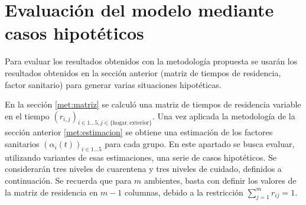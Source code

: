 \section{Evaluación del modelo mediante casos hipotéticos} \label{met:evaluacion}

Para evaluar los resultados obtenidos con la metodología propuesta se usarán los resultados obtenidos en la sección anterior (matriz de tiempos de residencia, factor sanitario) para generar varias situaciones hipotéticas.






En la sección \ref{met:matriz} se calculó una matriz de tiempos de residencia variable en el tiempo \((r_{i,j})_{i \in 1\dots 5, j \in \{ \text{hogar}, \text{exterior}\}}\).  Una vez aplicada la metodología de la sección anterior \ref{met:estimacion} se obtiene una estimación de los factores sanitarios \((\alpha_i(t))_{i \in 1 \dots 5}\) para cada grupo. En este apartado se busca evaluar, utilizando variantes de esas estimaciones, una serie de casos hipotéticos. Se considerarán tres niveles de cuarentena y tres niveles de cuidado, definidos a continuación. Se recuerda que para \(m\) ambientes, basta con definir los valores de la matriz de residencia en \(m-1\) columnas, debido a la restricción \(\sum_{j = 1}^m r_{ij} = 1\). 

